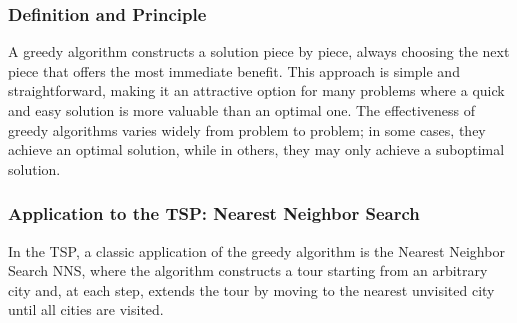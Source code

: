 \subsubsection{Definition and Principle}

A greedy algorithm constructs a solution piece by piece, always choosing the next piece that offers the most immediate benefit\cite{Papadimitriou1998}. This approach is simple and straightforward, making it an attractive option for many problems where a quick and easy solution is more valuable than an optimal one. The effectiveness of greedy algorithms varies widely from problem to problem; in some cases, they achieve an optimal solution, while in others, they may only achieve a suboptimal solution\cite{Lawler1985}.

\subsubsection{Application to the \Gls{TSP}: Nearest Neighbor Search}

In the \Gls{TSP}, a classic application of the greedy algorithm is the Nearest Neighbor Search \Gls{NNS}, where the algorithm constructs a tour starting from an arbitrary city and, at each step, extends the tour by moving to the nearest unvisited city until all cities are visited\cite{Gutin2016}.


